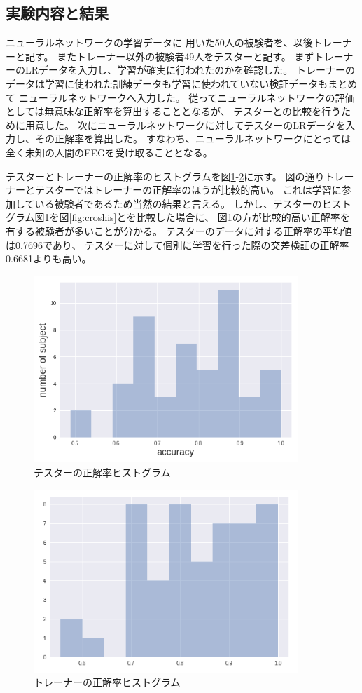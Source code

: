 \subsection{\mc 実験内容と結果}
ニューラルネットワークの学習データに
用いた50人の被験者を、以後トレーナーと記す。
またトレーナー以外の被験者49人をテスターと記す。
まずトレーナーのLRデータを入力し、学習が確実に行われたのかを確認した。
トレーナーのデータは学習に使われた訓練データも学習に使われていない検証データもまとめて
ニューラルネットワークへ入力した。
従ってニューラルネットワークの評価としては無意味な正解率を算出することとなるが、
テスターとの比較を行うために用意した。
次にニューラルネットワークに対してテスターのLRデータを入力し、その正解率を算出した。
すなわち、ニューラルネットワークにとっては全く未知の人間のEEGを受け取ることとなる。

テスターとトレーナーの正解率のヒストグラムを図\ref{fig:tesacc}-\ref{fig:tracc}に示す。
図の通りトレーナーとテスターではトレーナーの正解率のほうが比較的高い。
これは学習に参加している被験者であるため当然の結果と言える。
しかし、テスターのヒストグラム図\ref{fig:tesacc}を図\ref{fig:croshis}とを比較した場合に、
図\ref{fig:tesacc}の方が比較的高い正解率を有する被験者が多いことが分かる。
テスターのデータに対する正解率の平均値は0.7696であり、
テスターに対して個別に学習を行った際の交差検証の正解率0.6681よりも高い。
\begin{figure}[p]
    \centering
    \includegraphics[width=10cm]{images/tester_acc.png}
    \caption{テスターの正解率ヒストグラム}
    \label{fig:tesacc}
\end{figure}
\begin{figure}[p]
    \centering
    \includegraphics[width=10cm]{images/traineracc.png}
    \caption{トレーナーの正解率ヒストグラム}
    \label{fig:tracc}
\end{figure}
